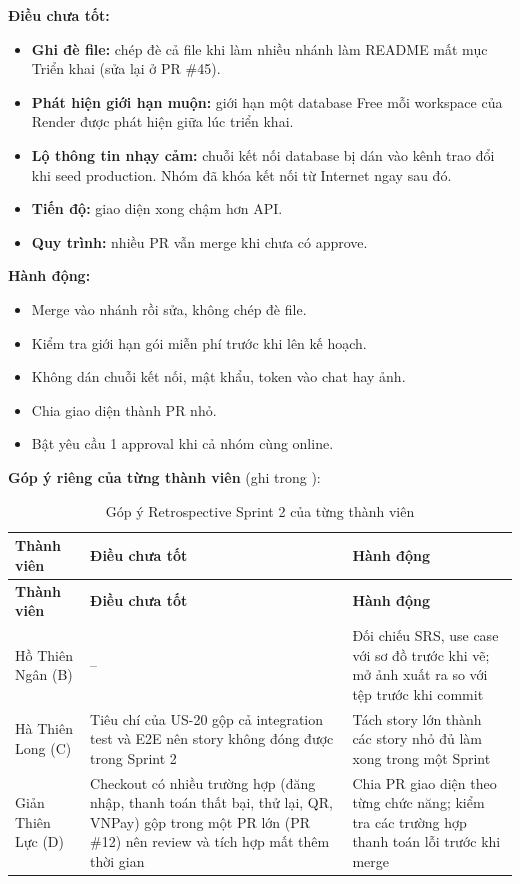 \textbf{Điều chưa tốt:}
\begin{itemize}
\item \textbf{Ghi đè file:} chép đè cả file khi làm nhiều nhánh làm README mất mục Triển khai (sửa lại ở PR \#45).
\item \textbf{Phát hiện giới hạn muộn:} giới hạn một database Free mỗi workspace của Render được phát hiện giữa lúc triển khai.
\item \textbf{Lộ thông tin nhạy cảm:} chuỗi kết nối database bị dán vào kênh trao đổi khi seed production. Nhóm đã khóa kết nối từ Internet ngay sau đó.
\item \textbf{Tiến độ:} giao diện xong chậm hơn API.
\item \textbf{Quy trình:} nhiều PR vẫn merge khi chưa có approve.
\end{itemize}

\textbf{Hành động:}
\begin{itemize}
\item Merge  vào nhánh rồi sửa, không chép đè file.
\item Kiểm tra giới hạn gói miễn phí trước khi lên kế hoạch.
\item Không dán chuỗi kết nối, mật khẩu, token vào chat hay ảnh.
\item Chia giao diện thành PR nhỏ.
\item Bật yêu cầu 1 approval khi cả nhóm cùng online.
\end{itemize}


\textbf{Góp ý riêng của từng thành viên} (ghi trong ):
\begin{longtable}{@{}L{2.4cm}L{6cm}L{5.4cm}@{}}
\caption{Góp ý Retrospective Sprint 2 của từng thành viên}\label{tab:retro2}\\
\toprule
\textbf{Thành viên} & \textbf{Điều chưa tốt} & \textbf{Hành động} \\ \midrule \endfirsthead
\toprule \textbf{Thành viên} & \textbf{Điều chưa tốt} & \textbf{Hành động} \\ \midrule \endhead
\bottomrule \endfoot
Hồ Thiên Ngân (B) & -- & Đối chiếu SRS, use case với sơ đồ trước khi vẽ; mở ảnh xuất ra so với tệp  trước khi commit \\
Hà Thiên Long (C) & Tiêu chí của US-20 gộp cả integration test và E2E nên story không đóng được trong Sprint 2 & Tách story lớn thành các story nhỏ đủ làm xong trong một Sprint \\
Giản Thiên Lực (D) & Checkout có nhiều trường hợp (đăng nhập, thanh toán thất bại, thử lại, QR, VNPay) gộp trong một PR lớn (PR \#12) nên review và tích hợp mất thêm thời gian & Chia PR giao diện theo từng chức năng; kiểm tra các trường hợp thanh toán lỗi trước khi merge \\
\end{longtable}

